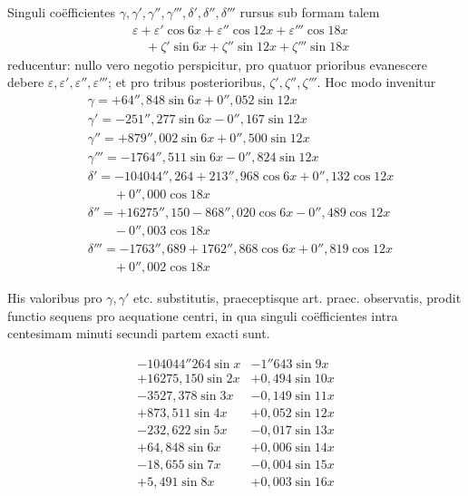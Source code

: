 Singuli coëfficientes \(\gamma,\gamma',\gamma'',\gamma''',\delta',\delta'',\delta'''\) rursus sub formam talem
\[
\begin{aligned}
&\varepsilon+\varepsilon'\cos 6x+\varepsilon''\cos 12x+\varepsilon'''\cos 18x\\[6pt]
&\quad+\zeta'\sin 6x+\zeta''\sin 12x+\zeta'''\sin 18x
\end{aligned}
\]
reducentur: nullo vero negotio perspicitur, pro quatuor prioribus evanescere debere \(\varepsilon,\varepsilon',\varepsilon'',\varepsilon'''\); et pro tribus posterioribus, \(\zeta',\zeta'',\zeta'''\). Hoc modo invenitur
\[
\begin{aligned}
&\gamma=+64''{,}848\sin 6x+0''{,}052\sin 12x\\[6pt]
&\gamma'=-251''{,}277\sin 6x-0''{,}167\sin 12x\\[6pt]
&\gamma''=+879''{,}002\sin 6x+0''{,}500\sin 12x\\[6pt]
&\gamma'''=-1764''{,}511\sin 6x-0''{,}824\sin 12x\\[6pt]
&\delta'=-104044''{,}264+213''{,}968\cos 6x+0''{,}132\cos 12x\\[6pt]
&\qquad{}+0''{,}000\cos 18x\\[6pt]
&\delta''=+16275''{,}150-868''{,}020\cos 6x-0''{,}489\cos 12x\\[6pt]
&\qquad{}-0''{,}003\cos 18x\\[6pt]
&\delta'''=-1763''{,}689+1762''{,}868\cos 6x+0''{,}819\cos 12x\\[6pt]
&\qquad{}+0''{,}002\cos 18x
\end{aligned}
\]

His valoribus pro \(\gamma,\gamma'\) etc. substitutis, praeceptisque art. praec. observatis, prodit functio sequens pro aequatione centri, in qua singuli coëfficientes intra centesimam minuti secundi partem exacti sunt.


\[
\begin{array}{r|r}
-104044''264\sin x&-1''643\sin 9x\\
+16275{,}150\sin 2x&+0{,}494\sin 10x\\
-3527{,}378\sin 3x&-0{,}149\sin 11x\\
+873{,}511\sin 4x&+0{,}052\sin 12x\\
-232{,}622\sin 5x&-0{,}017\sin 13x\\
+64{,}848\sin 6x&+0{,}006\sin 14x\\
-18{,}655\sin 7x&-0{,}004\sin 15x\\
+5{,}491\sin 8x&+0{,}003\sin 16x
\end{array}
\]


